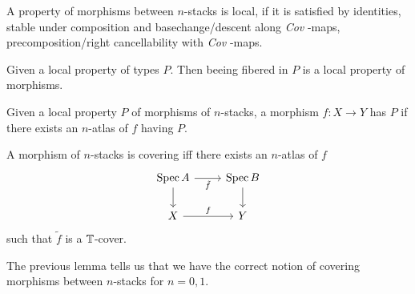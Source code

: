 \documentclass{article}
\newcommand{\Cov}{\emph{Cov} }
\begin{document}
\begin{definition}
    A property of morphisms between $n$-stacks is local, if it is satisfied by identities, stable under composition and basechange/descent along \Cov-maps, precomposition/right cancellability with \Cov-maps.
\end{definition}
\begin{lemma}
    Given a local property of types $P$. Then beeing fibered in $P$ is a local property of morphisms.
\end{lemma}
\begin{lemma}[\todocite]
    Given a local property $P$ of morphisms of $n$-stacks, a morphism $f : X \to Y$ has $P$ if there exists an $n$-atlas of $f$ having $P$.
\end{lemma}
\begin{example}
    A morphism of $n$-stacks is covering iff there exists an $n$-atlas of $f$ 
\[\begin{tikzcd}
	{\Spec A} & {\Spec B} \\
	X & Y
	\arrow["{\tilde f}"', from=1-1, to=1-2]
	\arrow[from=1-1, to=2-1]
	\arrow[from=1-2, to=2-2]
	\arrow["f", from=2-1, to=2-2]
\end{tikzcd}\]
such that $\tilde f$ is a $\mathbb{T}$-cover.
\end{example}
The previous lemma tells us that we have the correct notion of covering morphisms between  $n$-stacks for $n = 0,1$.
\end{document}
